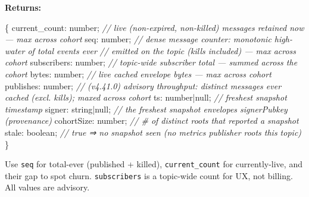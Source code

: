 \documentclass[
  nobib]{tufte-handout}
\newenvironment{Shaded}{}{}
\newcommand{\CommentTok}[1]{\textcolor[rgb]{0.38,0.63,0.69}{\textit{#1}}}
\newcommand{\DataTypeTok}[1]{\textcolor[rgb]{0.56,0.13,0.00}{#1}}
\newcommand{\NormalTok}[1]{#1}
\newcommand{\OperatorTok}[1]{\textcolor[rgb]{0.40,0.40,0.40}{#1}}
\begin{document}
\textbf{Returns:}

\begin{Shaded}
\begin{Highlighting}[]
\NormalTok{\{}
\NormalTok{  current\_count}\OperatorTok{:} \DataTypeTok{number}\OperatorTok{;}       \CommentTok{// live (non{-}expired, non{-}killed) messages retained now — max across cohort}
\NormalTok{  seq}\OperatorTok{:}           \DataTypeTok{number}\OperatorTok{;}       \CommentTok{// dense message counter: monotonic high{-}water of total events ever}
                               \CommentTok{//   emitted on the topic (kills included) — max across cohort}
\NormalTok{  subscribers}\OperatorTok{:}   \DataTypeTok{number}\OperatorTok{;}       \CommentTok{// topic{-}wide subscriber total — summed across the cohort}
\NormalTok{  bytes}\OperatorTok{:}         \DataTypeTok{number}\OperatorTok{;}       \CommentTok{// live cached envelope bytes — max across cohort}
\NormalTok{  publishes}\OperatorTok{:}     \DataTypeTok{number}\OperatorTok{;}       \CommentTok{// (v4.41.0) advisory throughput: distinct messages ever cached (excl. kills); maxed across cohort}
\NormalTok{  ts}\OperatorTok{:}            \DataTypeTok{number}\OperatorTok{|}\DataTypeTok{null}\OperatorTok{;}  \CommentTok{// freshest snapshot timestamp}
\NormalTok{  signer}\OperatorTok{:}        \DataTypeTok{string}\OperatorTok{|}\DataTypeTok{null}\OperatorTok{;}  \CommentTok{// the freshest snapshot envelope\textquotesingle{}s signerPubkey (provenance)}
\NormalTok{  cohortSize}\OperatorTok{:}    \DataTypeTok{number}\OperatorTok{;}       \CommentTok{// \# of distinct roots that reported a snapshot}
\NormalTok{  stale}\OperatorTok{:}         \DataTypeTok{boolean}\OperatorTok{;}      \CommentTok{// true ⇒ no snapshot seen (no metrics publisher roots this topic)}
\NormalTok{\}}
\end{Highlighting}
\end{Shaded}

Use \texttt{seq} for total-ever (published + killed),
\texttt{current\_count} for currently-live, and their gap to spot churn.
\texttt{subscribers} is a topic-wide count for UX, not billing. All
values are advisory.
\end{document}
